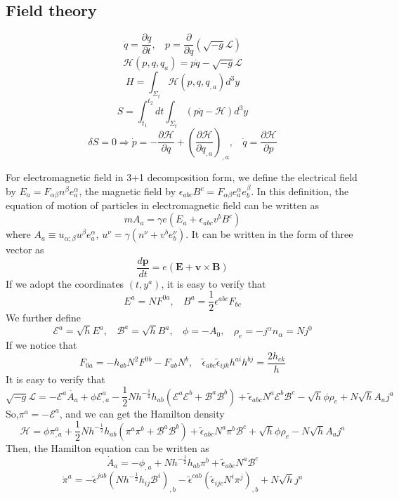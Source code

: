 \subsection{Field theory}
\[\dot{q} = \frac{\partial q}{\partial t}, \ \ \ \ p=\frac{\partial}{\partial \dot{q}}(\sqrt{-g} \mathcal{L})\]
\[\mathcal{H}(p,q,q_a) = p\dot{q} - \sqrt{-g} \mathcal{L}\]
\[H = \int_{\Sigma_t} \mathcal{H}(p,q,q_{,a})d^3y\]
\[S = \int_{t_1}^{t_2} dt \int_{\Sigma_t} (p \dot{q} - \mathcal{H} ) d^3 y\]
\[\delta S = 0 \Rightarrow \dot{p} = -\frac{\partial \mathcal{H}}{\partial q} + \left(\frac{\partial \mathcal{H}}{\partial q_{,a}}\right)_{,a}, \ \ \ \ \dot{q} = \frac{\partial \mathcal{H}}{\partial p}\]
\begin{example}
For electromagnetic field in 3+1 decomposition form, we define the electrical field by $E_a = F_{\alpha \beta} n^{\beta} e_a^{\alpha}$, the magnetic field by $\epsilon_{abc} B^c = F_{\alpha \beta} e_a^{\alpha} e_b^{\beta}$. 
In this definition, the equation of motion of particles in electromagnetic field can be written as
\[m A_a = \gamma e (E_a + \epsilon_{abc} v^b B^c)\]
where $A_a \equiv u_{\alpha;\beta} u^{\beta} e_a^{\alpha}$, $u^{\nu} = \gamma (n^{\nu} + v^b e_{b}^{\nu})$. 
It can be written in the form of three vector as
\[\frac{d\bm {p}}{dt} = e(\bm {E} + \bm {v} \times \bm {B})\]
If we adopt the coordinates $(t,y^a)$, it is easy to verify that
\[E^a = N F^{0a}, \ \ \ \ B^a = \frac{1}{2} \epsilon^{abc} F_{bc}\]
We further define
\[\mathcal{E}^a = \sqrt{h} E^a, \ \ \ \ \mathcal{B}^a = \sqrt{h} B^a, \ \ \ \ \phi = - A_0, \ \ \ \ \rho_{e} = -j^{\alpha} n_{\alpha} = N j^0\]
If we notice that
\[F_{0a} = -h_{ab}N^2F^{0b} - F_{ab}N^b, \ \ \ \ \tilde{\epsilon}_{abc} \tilde{\epsilon}_{ijk} h^{ai} h^{bj} = \frac{2h_{ck}}{h}\]
It is easy to verify that
\[ \sqrt{-g} \mathcal{L} = - \mathcal{E}^a \dot{A_a} + \phi \mathcal{E}^a_{,a} - \frac{1}{2} N h^{-\frac{1}{2}} h_{ab} (\mathcal{E}^a \mathcal{E}^b + \mathcal{B}^a \mathcal{B}^b) + \tilde{\epsilon}_{abc}N^a \mathcal{E}^b \mathcal{B}^c -\sqrt{h} \phi \rho_e + N \sqrt{h} A_a j^a\]
So,$\pi^a = -\mathcal{E}^a$, and we can get the Hamilton density
\[\mathcal{H} = \phi \pi^a_{,a} + \frac{1}{2} N h^{-\frac{1}{2}} h_{ab} (\pi^a \pi^b + \mathcal{B}^a \mathcal{B}^b) + \tilde{\epsilon}_{abc}N^a \pi^b \mathcal{B}^c +\sqrt{h} \phi \rho_e - N \sqrt{h} A_a j^a\]
Then, the Hamilton equation can be written as
\[\dot{A}_a = -\phi_{,a} + N h^{-\frac{1}{2}} h_{ab}\pi^b + \tilde{\epsilon}_{abc}N^a \mathcal{B}^c\]
\[\dot{\pi}^a = - \tilde{\epsilon}^{jab}(Nh^{-\frac{1}{2}}h_{ij}\mathcal{B}^i)_{,b} - \tilde{\epsilon}^{cab}(\tilde{\epsilon}_{ijc}N^i \pi^j)_{,b} + N\sqrt{h}j^a \]

\end{example}
